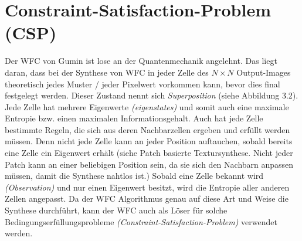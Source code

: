 \documentclass[12pt, a4paper,twoside,openany]{report} %
\begin{document}
\section{Constraint-Satisfaction-Problem {(CSP)}}

Der WFC von Gumin ist lose an der Quantenmechanik angelehnt.
Das liegt daran, dass bei der Synthese von WFC in jeder Zelle des $N\times N$ Output-Images theoretisch jedes Muster / jeder Pixelwert vorkommen kann, bevor dies final festgelegt werden.
Dieser Zustand nennt sich \textit{Superposition} {(siehe Abbildung 3.2)}.
Jede Zelle hat mehrere Eigenwerte \textit{(eigenstates)} und somit auch eine maximale Entropie bzw. einen maximalen Informationsgehalt.
Auch hat jede Zelle bestimmte Regeln, die sich aus deren Nachbarzellen ergeben und erfüllt werden müssen.
Denn nicht jede Zelle kann an jeder Position auftauchen, sobald bereits eine Zelle ein Eigenwert erhält
{(siehe Patch basierte Textursynthese. Nicht jeder Patch kann an einer beliebigen Position sein,
da sie sich den Nachbarn anpassen müssen, damit die Synthese nahtlos ist.)}
Sobald eine Zelle bekannt wird \textit{(Observation)} und nur einen Eigenwert besitzt,
wird die Entropie aller anderen Zellen angepasst.
 \cite[S.5, 2.2 The wave function]{Zinkernagel_2016}
Da der WFC Algorithmus genau auf diese Art und Weise die Synthese durchführt,
kann der WFC auch als Löser für solche Bedingungserfüllungsprobleme \textit{(Constraint-Satisfaction-Problem)} verwendet werden.\par
\end{document}
